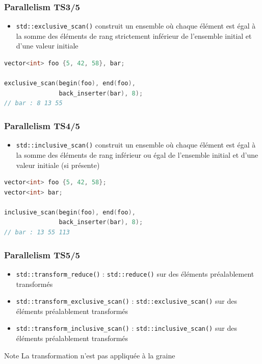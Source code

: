 \documentclass[C++.tex]{subfiles}
\begin{document}
\begin{frame}[fragile]
	\frametitle{Parallelism TS\titlehfill{}3/5}
	\begin{itemize}
		\item \lstinline|std::exclusive_scan()| construit un ensemble où chaque élément est égal à la somme des éléments de rang strictement inférieur de l'ensemble initial et d'une valeur initiale
	\end{itemize}

	\begin{lstlisting}[language=C++]
vector<int> foo {5, 42, 58}, bar;

exclusive_scan(begin(foo), end(foo), 
               back_inserter(bar), 8);
// bar : 8 13 55\end{lstlisting}
\end{frame}

\begin{frame}[fragile]
	\frametitle{Parallelism TS\titlehfill{}4/5}
	\begin{itemize}
		\item \lstinline|std::inclusive_scan()| construit un ensemble où chaque élément est égal à la somme des éléments de rang inférieur ou égal de l'ensemble initial et d'une valeur initiale (si présente)
	\end{itemize}

	\begin{lstlisting}[language=C++]
vector<int> foo {5, 42, 58};
vector<int> bar;

inclusive_scan(begin(foo), end(foo), 
               back_inserter(bar), 8);
// bar : 13 55 113\end{lstlisting}

\end{frame}

\begin{frame}[fragile]
	\frametitle{Parallelism TS\titlehfill{}5/5}
	\begin{itemize}
		\item \lstinline|std::transform_reduce()| : \lstinline|std::reduce()| sur des éléments préalablement transformés
		\item \lstinline|std::transform_exclusive_scan()| : \lstinline|std::exclusive_scan()| sur des éléments préalablement transformés
		\item \lstinline|std::transform_inclusive_scan()| : \lstinline|std::inclusive_scan()| sur des éléments préalablement transformés
	\end{itemize}

	\begin{block}{Note}
		La transformation n'est pas appliquée à la graine
	\end{block}
\end{frame}
\end{document}

